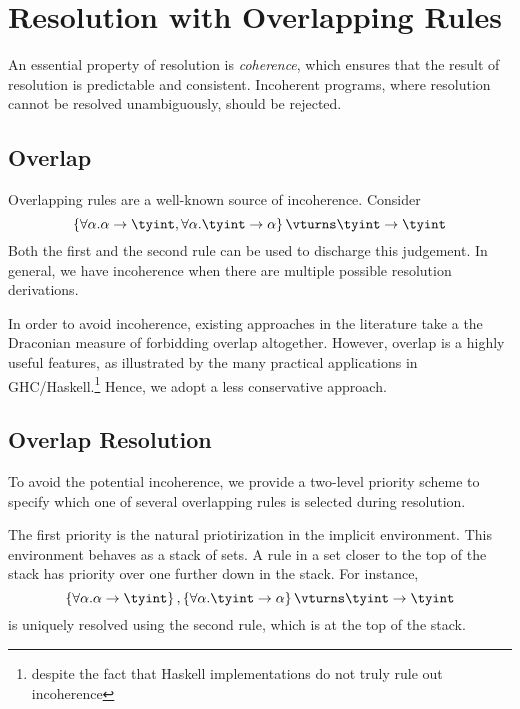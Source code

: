 
\section{Resolution with Overlapping Rules}
\label{sec:resolution}

An essential property of resolution is \textit{coherence}, which ensures that
the result of resolution is predictable and consistent. Incoherent programs,
where resolution cannot be resolved unambiguously, should be rejected.

\subsection{Overlap}
Overlapping rules are a well-known source of incoherence. Consider
\begin{equation*}
\left\{ \forall \alpha. \alpha \rightarrow \tyint,  
        \forall \alpha. \tyint \rightarrow \alpha \right\} \vturns \tyint \rightarrow \tyint
\end{equation*}
Both the first and the second rule can be used to discharge this judgement.
In general, we have incoherence when there are multiple possible resolution derivations.

In order to avoid incoherence, existing approaches in the literature take a the
Draconian measure of forbidding overlap altogether. However, overlap
is a highly useful features, as illustrated by the many practical
applications in GHC/Haskell.\footnote{despite the fact that Haskell
implementations do not truly rule out incoherence}
Hence, we adopt a less conservative approach.

\subsection{Overlap Resolution}
To avoid the potential incoherence, we provide a two-level priority scheme to
specify which one of several overlapping rules is selected during resolution. 

The first priority is the natural priotirization in the implicit environment.
This environment behaves as a stack of sets. A rule in a set closer to the top
of the stack has priority over one further down in the stack. For instance,
\begin{equation*}
\left\{ \forall \alpha. \alpha \rightarrow \tyint \right\},  
\left\{ \forall \alpha. \tyint \rightarrow \alpha \right\} \vturns \tyint \rightarrow \tyint
\end{equation*}
is uniquely resolved using the second rule, which is at the top of the stack.

